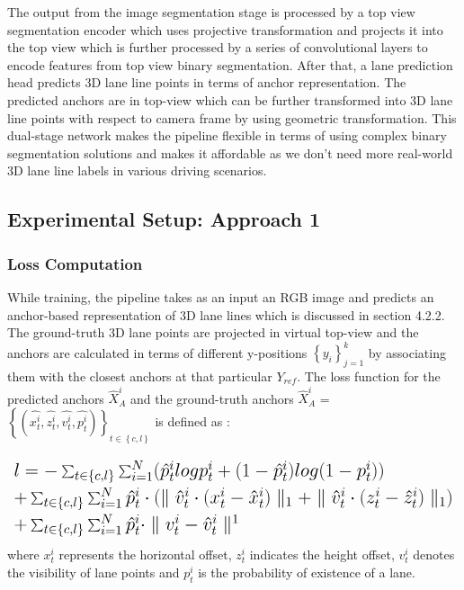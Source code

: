          The output from the image segmentation stage is processed by a top view segmentation encoder which uses projective transformation and projects it into the top view which is further processed by a series of convolutional layers to encode features from top view binary segmentation. After that, a lane prediction head predicts 3D lane line points in terms of anchor representation. The predicted anchors are in top-view which can be further transformed into 3D lane line points with respect to camera frame by using geometric transformation. This dual-stage network makes the pipeline flexible in terms of using complex binary segmentation solutions and makes it affordable as we don't need more real-world 3D lane line labels in various driving scenarios.
        
        
        \subsection{Experimental Setup: Approach 1}
        
        
            \subsubsection{Loss Computation}
            While training, the pipeline takes as an input an RGB image and predicts an anchor-based representation of 3D lane lines which is discussed in section 4.2.2. The ground-truth 3D lane points are projected in virtual top-view and the anchors are calculated in terms of different y-positions $\left\{ y_{i} \right\}^{k}_{j=1}$ by associating them with the closest anchors at that particular $Y_{ref}$. The loss function for the predicted anchors $\hat{X}_{A}^{i}$ and the ground-truth anchors $\hat{X}_{A}^{i}$ =$ \left\{(\hat{x^{i}_{t}},\hat{z^{i}_{t}},\hat{v^{i}_{t}},\hat{p^{i}_{t}})\right\}_{t\in\left\{c,l\right\}}     $ is defined as \cite{guo2020gen}: 
            
            \begin{equation}%
\mbox{\fontsize{15}{21.6}\selectfont\( %
 \begin{array}{l}
                l = - \sum_{t\in\left\{c,l\right\}} \sum ^{N}_{i=1}(\hat{p}^{i}_{t} logp^{i}_{t} + (1-\hat{p}^{i}_{t})log(1-p^{i}_{t}) )   \\ 
                +  \sum_{t\in\left\{c,l\right\}} \sum ^{N}_{i=1}\hat{p}^{i}_{t}\cdot(\parallel \hat{v}^{i}_{t} \cdot (x^{i}_{t} - \hat{x}^{i}_{t}) \parallel_{1} + \parallel \hat{v}^{i}_{t} \cdot (z^{i}_{t} - \hat{z}^{i}_{t}) \parallel_{1} ) \\ 
                + \sum_{t\in\left\{c,l\right\}} \sum ^{N}_{i=1} \hat{p}^{i}_{t} \cdot \parallel v^{i}_{t} - \hat{v}^{i}_{t} \parallel^{1}
            \end{array} %
\)} %
\end{equation}
            where $x^{i}_{t}$ represents the horizontal offset, $z^{i}_{t}$ indicates the height offset, $v^{i}_{t}$ denotes the visibility of lane points and $p^{i}_{t}$ is the probability of existence of a lane.  
        
